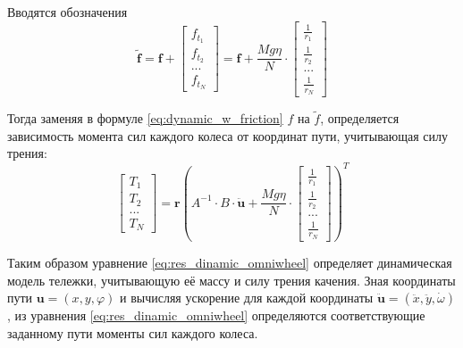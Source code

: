 \documentclass[oneside,final,14pt]{extreport}
\newcommand{\bs}{\boldsymbol}
\begin{document}
Вводятся обозначения
\begin{equation}
\bs{\tilde{f}}
=
\bs{f}
+
\begin{bmatrix}
f_{t_{1}} \\
f_{t_{2}} \\
... \\
f_{t_{N}}
\end{bmatrix}
=
\bs{f}
+
\frac{Mg\eta}{N}
\cdot
\begin{bmatrix}
\frac{1}{r_{1}} \\
\frac{1}{r_{2}} \\
...       \\
\frac{1}{r_{N}}
\end{bmatrix}
\end{equation}

Тогда заменяя в формуле \ref{eq:dynamic_w_friction} $f$ на $\tilde{f}$, определяется зависимость момента сил каждого колеса от координат пути, учитывающая силу трения:
\begin{equation}
\label{eq:res_dinamic_omniwheel}
\begin{bmatrix}
T_{1} \\
T_{2} \\
... \\
T_{N}
\end{bmatrix}
=
\bs{r}
(
A^{-1}
\cdot
B 
\cdot
\bs{
\ddot{u}
}
+
\frac{Mg\eta}{N}
\cdot
\begin{bmatrix}
\frac{1}{r_{1}} \\
\frac{1}{r_{2}} \\
...       \\
\frac{1}{r_{N}}
\end{bmatrix}
)^{T}
\end{equation} 

Таким образом уравнение \ref{eq:res_dinamic_omniwheel} определяет динамическая модель тележки, учитывающую её массу и силу трения качения. Зная координаты пути $\bs{u} = (x,y,\varphi)$ и вычисляя ускорение для каждой координаты $\bs{\ddot{u}} = (\ddot{x},\ddot{y},\dot{\omega})$, из уравнения \ref{eq:res_dinamic_omniwheel} определяются соответствующие заданному пути моменты сил каждого колеса.

\iffalse
В работе ref более детально рассматривается динамическая модель тележки на N роликонесущих колесах.  Модель тележки строится исходя из предположения о том, что модель роликонесущего колеса — твердый диск, скорость наинизшей точки которого перпендикулярна направлению оси ролика в этой точке. Кроме того, рассмотрен критерий управляемости такой модели, из которого следует ряд ограничений на его конструкцию. Например если сумма угла оси ролика и угла поворота колеса всех роликонесущих колес равна, то такая модель не может двигаться по произвольной трактории. Если же эти углы у двух колес совпадают, то пару колес можно принять за одно виртуальное колесо с радиус вектором $r_{ij} = r_{i} - r_{j}$ в локальной системе координат и моментом $T_{ij} = T_{i} + T_{j}$.
\fi
\end{document}
